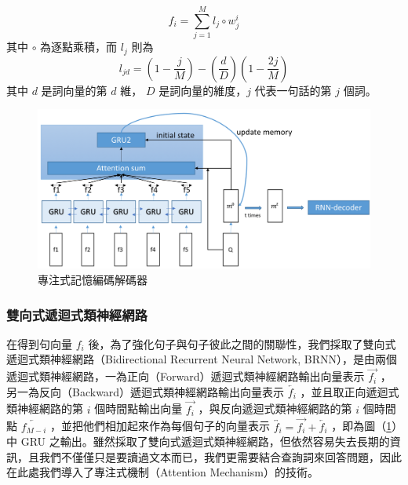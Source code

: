 \begin{equation}
    f_i = \sum_{j=1}^M l_j \circ w_j^i
\end{equation}
其中 $\circ$ 為逐點乘積，而 $l_j$ 則為
\begin{equation}
    l_{jd} = (1 - \frac{j}{M}) - (\frac{d}{D})(1 - \frac{2j}{M}) \label{PE}
\end{equation}
其中 $d$ 是詞向量的第 $d$ 維， $D$ 是詞向量的維度，$j$ 代表一句話的第 $j$ 個詞。

\begin{figure}[h]
    \centering
    \includegraphics[scale=0.54]{images/chap3_dmn.png}
    \caption{專注式記憶編碼解碼器}\label{fig:dmn}
\end{figure}
\subsubsection{雙向式遞迴式類神經網路}
在得到句向量 $f_i$ 後，為了強化句子與句子彼此之間的關聯性，我們採取了雙向式遞迴式類神經網路（Bidirectional Recurrent Neural Network, BRNN），是由兩個遞迴式類神經網路，一為正向（Forward）遞迴式類神經網路輸出向量表示 $\overrightarrow{f_i}$ ，另一為反向（Backward）遞迴式類神經網路輸出向量表示 $\overleftarrow{f_i}$ ，並且取正向遞迴式類神經網路的第 $i$ 個時間點輸出向量 $\overrightarrow{f_i}$ ，與反向遞迴式類神經網路的第 $i$ 個時間點 $\overleftarrow{f_{M-i}}$ ，並把他們相加起來作為每個句子的向量表示 $\overleftrightarrow{f_i} = \overrightarrow{f_i} + \overleftarrow{f_i}$ ，即為圖（\ref{fig:dmn}）中 GRU 之輸出。雖然採取了雙向式遞迴式類神經網路，但依然容易失去長期的資訊，且我們不僅僅只是要讀過文本而已，我們更需要結合查詢詞來回答問題，因此在此處我們導入了專注式機制（Attention Mechanism）的技術。

